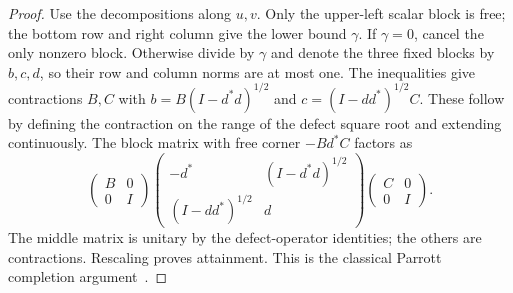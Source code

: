 \begin{proof}
Use the decompositions along $u,v$. Only the upper-left scalar block is free; the bottom row and right column give the lower bound $\gamma$. If $\gamma=0$, cancel the only nonzero block. Otherwise divide by $\gamma$ and denote the three fixed blocks by $b,c,d$, so their row and column norms are at most one. The inequalities give contractions $B,C$ with
$b=B(I-d^*d)^{1/2}$ and $c=(I-dd^*)^{1/2}C$. These follow by defining the contraction on the range of the defect square root and extending continuously. The block matrix with free corner $-Bd^*C$ factors as
\[
 \begin{pmatrix}B&0\\0&I\end{pmatrix}
 \begin{pmatrix}-d^*&(I-d^*d)^{1/2}\\(I-dd^*)^{1/2}&d\end{pmatrix}
 \begin{pmatrix}C&0\\0&I\end{pmatrix}.
\]
The middle matrix is unitary by the defect-operator identities; the others are contractions. Rescaling proves attainment. This is the classical Parrott completion argument~\cite{parrott}.
\end{proof}
